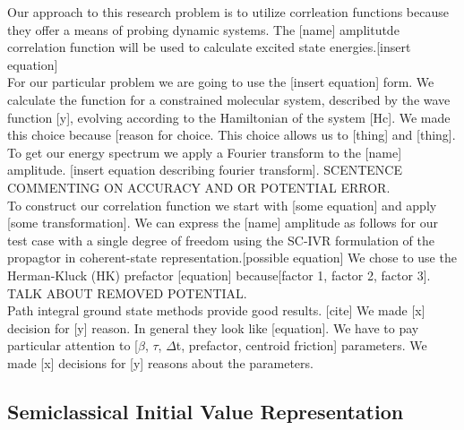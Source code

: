 Our approach to this research problem is to utilize corrleation functions because they offer a means of probing dynamic systems. The [name] amplitutde correlation function will be used to calculate excited state energies.[insert equation]\\
For our particular problem we are going to use the [insert equation] form. We calculate the function for a constrained molecular system, described by the wave function [y], evolving according to the Hamiltonian of the system [Hc]. We made this choice because [reason for choice. This choice allows us to [thing] and [thing]. \\
To get our energy spectrum we apply a Fourier transform to the [name] amplitude. [insert equation describing fourier transform]. SCENTENCE COMMENTING ON ACCURACY AND OR POTENTIAL ERROR. \\

To construct our correlation function we start with [some equation] and apply [some transformation]. We can express the [name] amplitude as follows for our test case with a single degree of freedom using the SC-IVR formulation of the propagtor in coherent-state representation.[possible equation] We chose to use the Herman-Kluck (HK) prefactor [equation] because[factor 1, factor 2, factor 3].~\cite{kay2006herman} TALK ABOUT REMOVED POTENTIAL. \\

Path integral ground state methods provide good results. [cite] We made [x] decision for [y] reason. In general they look like [equation]. We have to pay particular attention to [$\beta$, $\tau$, $\Delta$t, prefactor, centroid friction] parameters. We made [x] decisions for [y] reasons about the parameters.

\subsection*{Semiclassical Initial Value Representation}




